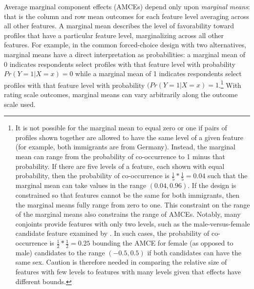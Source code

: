 \documentclass[a4paper,12pt]{article}\usepackage[]{graphicx}\usepackage[]{color}
\begin{document}
Average marginal component effects (AMCEs) depend only upon \textit{marginal means}: that is the column and row mean outcomes for each feature level averaging across all other features. A marginal mean describes the level of favorability toward profiles that have a particular feature level, marginalizing across all other features. For example, in the common forced-choice design with two alternatives, marginal means have a direct interpretation as probabilities: a marginal mean of 0 indicates respondents select profiles with that feature level with probability $Pr(Y=1|X=x) = 0$ while a marginal mean of 1 indicates respondents select profiles with that feature level with probability $(Pr(Y=1|X=x)=1$.\footnote{It is not possible for the marginal mean to equal zero or one if pairs of profiles shown together are allowed to have the same level of a given feature (for example, both immigrants are from Germany). Instead, the marginal mean can range from the probability of co-occurrence to 1 minus that probability. If there are five levels of a feature, each shown with equal probability, then the probability of co-occurrence is $\frac{1}{5}*\frac{1}{5} = 0.04$ such that the marginal mean can take values in the range $(0.04,0.96)$. If the design is constrained so that features cannot be the same for both immigrants, then the marginal means fully range from zero to one. This constraint on the range of the marginal means also constrains the range of AMCEs. Notably, many conjoints provide features with only two levels, such as the male-versus-female candidate feature examined by \citet{TeeleKallaRosenbluth2018}. In such cases, the probability of co-occurrence is $\frac{1}{2}*\frac{1}{2} = 0.25$ bounding the AMCE for female (as opposed to male) candidates to the range $(-0.5, 0.5)$ if both candidates can have the same sex. Caution is therefore needed in comparing the relative size of features with few levels to features with many levels given that effects have different bounds.} With rating scale outcomes, marginal means can vary arbitrarily along the outcome scale used.
\end{document}
